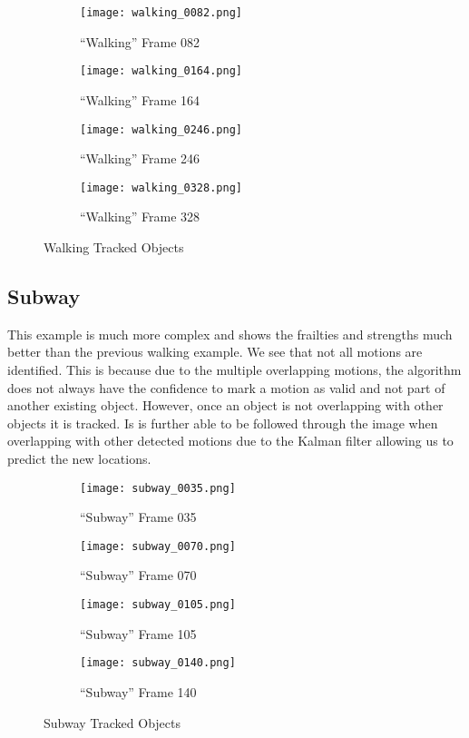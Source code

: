 \documentclass[11pt]{article}
\begin{document}
\begin{figure}[h]
\centering
\begin{subfigure}[t]{0.24\textwidth}
\texttt{[image: walking\_0082.png]}
\caption{``Walking'' Frame 082}
\label{fig:walk_082}
\end{subfigure}
\begin{subfigure}[t]{0.24\textwidth}
\texttt{[image: walking\_0164.png]}
\caption{``Walking'' Frame 164}
\label{fig:walk_164}
\end{subfigure}
\begin{subfigure}[t]{0.24\textwidth}
\texttt{[image: walking\_0246.png]}
\caption{``Walking'' Frame 246}
\label{fig:walk_246}
\end{subfigure}
\begin{subfigure}[t]{0.24\textwidth}
\texttt{[image: walking\_0328.png]}
\caption{``Walking'' Frame 328}
\label{fig:walk_328}
\end{subfigure}

\caption{Walking Tracked Objects}
\end{figure}

\subsection{Subway}
This example is much more complex and shows the frailties and strengths much better than the previous walking example. We see that not all motions are identified. This is because due to the multiple overlapping motions, the algorithm does not always have the confidence to mark a motion as valid and not part of another existing object. However, once an object is not overlapping with other objects it is tracked. Is is further able to be followed through the image when overlapping with other detected motions due to the Kalman filter allowing us to predict the new locations. 
\begin{figure}[h]
\centering
\begin{subfigure}[t]{0.24\textwidth}
\texttt{[image: subway\_0035.png]}
\caption{``Subway'' Frame 035}
\label{fig:sub_035}
\end{subfigure}
\begin{subfigure}[t]{0.24\textwidth}
\texttt{[image: subway\_0070.png]}
\caption{``Subway'' Frame 070}
\label{fig:sub_070}
\end{subfigure}
\begin{subfigure}[t]{0.24\textwidth}
\texttt{[image: subway\_0105.png]}
\caption{``Subway'' Frame 105}
\label{fig:sub_105}
\end{subfigure}
\begin{subfigure}[t]{0.24\textwidth}
\texttt{[image: subway\_0140.png]}
\caption{``Subway'' Frame 140}
\label{fig:sub_140}
\end{subfigure}

\caption{Subway Tracked Objects}
\end{figure}
\end{document}
